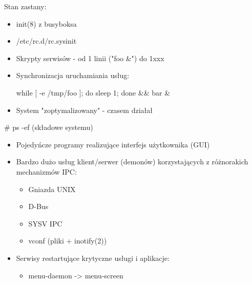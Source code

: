 \documentclass[presentation,aspectratio=43,12pt]{beamer}
\begin{document}
\begin{frame}[label=sec-6-1]{Stan zastany:}
\begin{itemize}
\item init(8) z busyboksa
\item /etc/rc.d/rc.sysinit
\item Skrypty serwisów - od 1 linii  ("foo \&") do 1xxx

\item Synchronizacja uruchamiania usług:

while [ -e /tmp/foo ]; do sleep 1; done \&\& bar \&
\end{itemize}


\begin{itemize}
\item <2-> System "zoptymalizowany" - czasem działał
\end{itemize}

\end{frame}
\begin{frame}[label=sec-6-2]{\# ps -ef (składowe systemu)}
\begin{itemize}
\item Pojedyńcze programy realizujące interfejs użytkownika (GUI)

\item <2-> Bardzo dużo usług klient/serwer (demonów) korzystających z
różnorakich mechanizmów IPC:
\begin{itemize}
\item Gniazda UNIX
\item D-Bus
\item SYSV IPC
\item vconf (pliki + inotify(2))
\end{itemize}

\item <3-> Serwisy restartujące krytyczne usługi i aplikacje:
\begin{itemize}
\item menu-daemon -> menu-screen
\end{itemize}
\end{itemize}
\end{frame}
\end{document}

